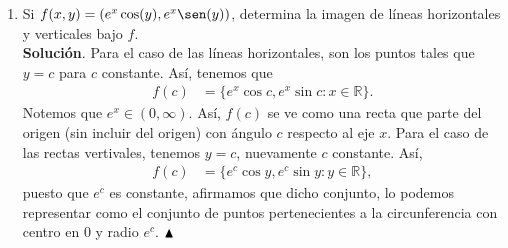 \documentclass[12pt]{article}
\newcommand{\R}{\mathbb R}
\begin{document}
\begin{enumerate}
\newpage
\item Si $f(x,y)=(e^x\cos(y),e^x\sen(y))$, determina la imagen de l\'ineas horizontales y verticales bajo $f$. \\
\textbf{Solución}. Para el caso de las líneas horizontales, son los puntos tales que $y=c$ para $c$ constante. Así, tenemos que
\begin{align*}
    f(c) &= \{e^x\cos c,e^x \sin c:x\in \R\}.
\end{align*}
Notemos que $e^x \in (0,\infty)$. Así, $f(c)$ se ve como una recta que parte del origen (sin incluir del origen) con ángulo $c$ respecto al eje $x$.
Para el caso de las rectas vertivales, tenemos $y=c$, nuevamente $c$ constante. Así,
\begin{align*}
    f(c) &= \{e^c\cos y,e^c \sin y:y\in \R\},
\end{align*}
puesto que $e^c$ es constante, afirmamos que dicho conjunto, lo podemos representar como el conjunto de puntos pertenecientes a la circunferencia con centro en 0 y radio $e^c$. $\hfill \blacktriangle$




\end{enumerate}
\end{document}

